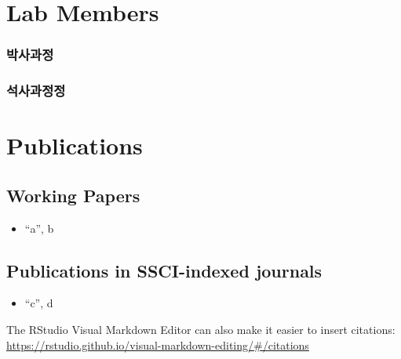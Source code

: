 \documentclass[
]{book}
\providecommand{\tightlist}{%
  \setlength{\itemsep}{0pt}\setlength{\parskip}{0pt}}
\begin{document}
\hypertarget{lab-members}{%
\chapter{Lab Members}\label{lab-members}}

\hypertarget{uxbc15uxc0acuxacfcuxc815}{%
\subsection{박사과정}\label{uxbc15uxc0acuxacfcuxc815}}

\hypertarget{uxc11duxc0acuxacfcuxc815uxc815}{%
\subsection{석사과정정}\label{uxc11duxc0acuxacfcuxc815uxc815}}

\hypertarget{publications}{%
\chapter{Publications}\label{publications}}

\hypertarget{working-papers}{%
\section{Working Papers}\label{working-papers}}

\begin{itemize}
\tightlist
\item
  ``a'', b
\end{itemize}

\hypertarget{publications-in-ssci-indexed-journals}{%
\section{Publications in SSCI-indexed journals}\label{publications-in-ssci-indexed-journals}}

\begin{itemize}
\tightlist
\item
  ``c'', d
\end{itemize}

The RStudio Visual Markdown Editor can also make it easier to insert citations: \url{https://rstudio.github.io/visual-markdown-editing/\#/citations}

  
\end{document}
